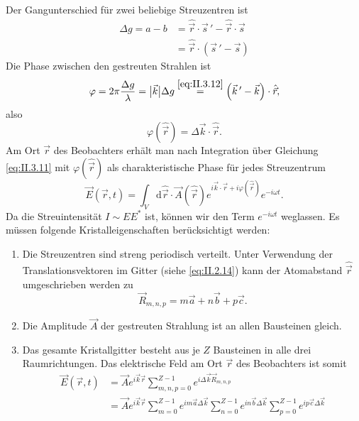 	Der Gangunterschied für zwei beliebige Streuzentren ist
	\begin{equation}
		\label{eq:II.3.12}
		\begin{split}
			\Delta g = a - b &= \hat{\Vec{r}} \cdot \Vec{s}\, ' - \hat{\Vec{r}}\cdot  \Vec{s} \\
			&= \hat{\Vec{r}}\cdot\left( \Vec{s} \, ' - \Vec{s} \right) 
		\end{split}
	\end{equation}
	Die Phase zwischen den gestreuten Strahlen ist
	\begin{equation}
		\label{eq:II.3.13}
		\varphi = 2 \pi \frac{\Delta g}{\lambda} = \big| \Vec{k} \big| \Delta g \overset{\ref{eq:II.3.12}}{=} \left( \Vec{k}\,' - \Vec{k} \right)\cdot\hat{\Vec{r}},
	\end{equation}
	also
	\begin{equation}
		\label{eq:II.3.14}
		\varphi(\hat{\Vec{r}}) = \Delta \Vec{k} \cdot \hat{\Vec{r}}.
	\end{equation}
	Am Ort $\Vec{r}$ des Beobachters erhält man nach Integration über Gleichung \eqref{eq:II.3.11} mit $\varphi(\hat{\Vec{r}})$ als charakteristische Phase für jedes Streuzentrum
	\begin{equation}
		\label{eq:II.3.15}
		\Vec{E} (\Vec{r}, t) = \int_{V} \mathrm{d}\hat{\Vec{r}}\cdot \Vec{A}(\hat{\Vec{r}}) e^{i \Vec{k}\cdot\Vec{r} + i \varphi(\hat{\Vec{r}})} e^{-i \omega t}.
	\end{equation}
	Da die Streuintensität $I \sim E E^{*}$ ist, können wir den Term $e^{-i \omega t}$ weglassen. Es müssen folgende Kristalleigenschaften berücksichtigt werden:
	\begin{enumerate}
		\item Die Streuzentren sind streng periodisch verteilt. 
			Unter Verwendung der Translationsvektoren im Gitter (siehe \eqref{eq:II.2.14}) kann der Atomabstand $\hat{\vec r}$ umgeschrieben werden zu
			\begin{equation}
				\label{eq:II.3.16}
				\Vec{R}_{m,n,p} = m \Vec{a} + n \Vec{b} + p \Vec{c}.
			\end{equation}
		\item Die Amplitude $\Vec{A}$ der gestreuten Strahlung ist an allen Bausteinen gleich.
		\item Das gesamte Kristallgitter besteht aus je $Z$ Bausteinen in alle drei Raumrichtungen. Das elektrische Feld am Ort $\vec r$ des Beobachters ist somit
			\begin{equation}
				\label{eq:II.3.18}
				\begin{split}
					\Vec{E}(\Vec{r}, t) &= \Vec{A} e^{i \Vec{k} \Vec{r}} \sum_{m,n,p = 0 }^{Z-1} e^{i \Delta \Vec{k} \Vec{R}_{m,n,p}}  \\
					&=  \Vec{A} e^{i \Vec{k} \Vec{r}} \sum_{m = 0}^{Z-1} e^{ i m \Vec{a} \Delta \Vec{k}} \sum_{n = 0}^{Z-1} e^{i n \Vec{b} \Delta \Vec{k}} \sum_{p = 0}^{Z-1} e^{ip \Vec{c} \Delta \Vec{k}}    \\
				\end{split}
			\end{equation}
	\end{enumerate}

